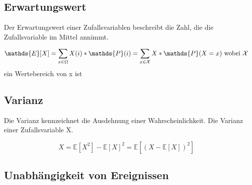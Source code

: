 \documentclass{article}
\begin{document}
\vspace{10pt}

\subsection *{Erwartungswert}

\vspace{5pt}

 Der Erwartungswert einer Zufallsvariablen beschreibt die Zahl, die die Zufallsvariable im Mittel annimmt.

\vspace{3pt}

\begin{equation*}
\mathds{E} [X] = \sum_{x \in \Omega} X (i) * \mathds{P} ({i}) = \sum_{x\in\mathcal{X}} X* \mathds{P} (X=x)$ wobei $\mathcal{X}
\end{equation*}
 ein Wertebereich von x ist 


\vspace{10pt}

\subsection *{Varianz}

\vspace{5pt}

Die Varianz kennzeichnet die Ausdehnung einer Wahrscheinlichkeit. Die Varianz einer Zufallsvariable X.

\vspace{3pt}

\begin{equation*}
X= \mathds{E} [X^2] - \mathds{E} [X]^2 = \mathds{E} [ (X - \mathds{E} [X] )^2 ] 
\end{equation*}

\vspace{10pt}

\subsection *{Unabh\"angigkeit von Ereignissen}

\vspace{5pt}
\end{document}
